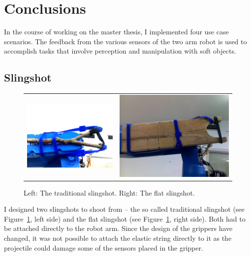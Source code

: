 \section{Conclusions}
    In the course of working on the master thesis, I implemented four use case scenarios. The feedback from the various sensors of the two arm \CloPeMa\/ robot is used to accomplish tasks that involve perception and manipulation with soft objects.    

    \subsection{Slingshot}

        \begin{figure}[h]
            \centering
            \begin{tabular}{cc}
            \includegraphics[height=0.3\textwidth]{Img/slingshot/attached_slingshotAdj.png}
            &
            \includegraphics[height=0.3\textwidth]{Img/slingshot/attached_flat_slingshot.png}
            \end{tabular}
            \caption{Left: The traditional slingshot. Right: The flat slingshot.}
            \label{fig:Slingshots}
        \end{figure}

        I designed two slingshots to shoot from -- the so called traditional slingshot (see Figure~\ref{fig:Slingshots}, left side) and the flat slingshot (see Figure~\ref{fig:Slingshots}, right side). Both had to be attached directly to the robot arm. Since the design of the grippers have changed, it was not possible to attach the elastic string directly to it as the projectile could damage some of the sensors placed in the gripper.

